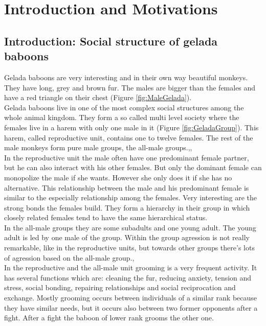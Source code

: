 \documentclass[11pt]{article}
\begin{document}
\section{Introduction and Motivations}
\subsection{Introduction: Social structure of gelada baboons}
\label{sec:Introduction}
Gelada baboons are very interesting and in their own way beautiful monkeys. They have long, grey and brown fur. The males are bigger than the females and have a red triangle on their chest (Figure \ref{fig:MaleGelada}).\\
Gelada baboons live in one of the most complex social structures among the whole animal kingdom. They form a so called multi level society where the females live in a harem with only one male in it (Figure \ref{fig:GeladaGroup}). This harem, called reproductive unit, contains one to twelve females. The rest of the male monkeys form pure male groups, the all-male groups.\cite{Dunbar1986},\cite{Crook1966},\cite{Gruter2004}\\
In the reproductive unit the male often have one predominant female partner, but he can also interact with his other females. But only the dominant female can monopolize the male if she wants. However she only does it if she has no alternative.\cite{Dunbar1983} This relationship between the male and his predominant female is similar to the especially relationship among the females. Very interesting are the  strong bonds the females build.\cite{Dunbar1986} They form a hierarchy in their group in which closely related females tend to have the same hierarchical status.\cite{Dunbar1980}\\
In the all-male groups they are some subadults and one young adult. The young adult is led by one male of the group.\cite{Dunbar1974} Within the group agression is not really remarkable, like in the reproductive units, but towards other groups there's lots of agression based on the all-male group.\cite{Dunbar1974},\cite{Dunbar1984}\\
In the reproductive and the all-male unit grooming is a very frequent activity. It has several functions which are: cleaning the fur, reducing anxiety, tension and stress, social bonding, repairing relationships and social reciprocation and exchange.\cite{Puga-Gonzalez2009} Mostly grooming occurs between individuals of a similar rank because they have similar needs, but it occurs also between two former opponents after a fight.\cite{Puga-Gonzalez2009} After a fight the baboon of lower rank grooms the other one.\\
\end{document}
